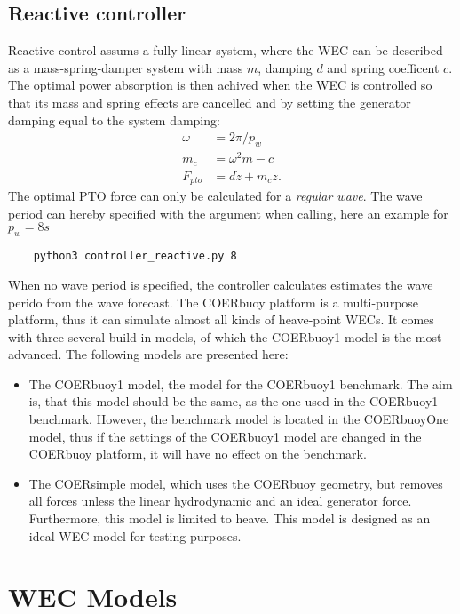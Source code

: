 \documentclass[oneside,10pt,a4paper]{book}
\begin{document}
\subsection{Reactive controller}
Reactive control assums a fully linear system, where the WEC can be described as a mass-spring-damper system with mass $m$, damping $d$ and spring coefficent $c$. The optimal power absorption is then achived when the WEC is controlled so that its mass and spring effects are cancelled and by setting the generator damping equal to the system damping:
\begin{align*}
	\omega&=2\pi/p_w\\
	m_c&=\omega^2 m-c\\
	F_{pto}&=d\dot{z}+m_c z\text{.}
\end{align*}
The optimal PTO force can only be calculated for a \textit{regular wave}. The wave period can hereby specified with the argument when calling, here an example for $p_w=8 s$
\begin{verbatim}
	python3 controller_reactive.py 8
\end{verbatim}
When no wave period is specified, the controller calculates estimates the wave perido from the wave forecast.
The COERbuoy platform is a multi-purpose platform, thus it can simulate almost all kinds of heave-point WECs. It comes with three several build in models, of which the COERbuoy1 model is the most advanced.
The following models are presented here:
\begin{itemize}
	\item The COERbuoy1 model, the model for the COERbuoy1 benchmark. The aim is, that this model should be the same, as the one used in the COERbuoy1 benchmark. However, the benchmark model is located in the COERbuoyOne model, thus if the settings of the COERbuoy1 model are changed in the COERbuoy platform, it will have no effect on the benchmark.
	\item The COERsimple model, which uses the COERbuoy geometry, but removes all forces unless the linear hydrodynamic and an ideal generator force. Furthermore, this model is limited to heave. This model is designed as an ideal WEC model for testing purposes. 
\end{itemize}
\section{WEC Models}
\end{document}
